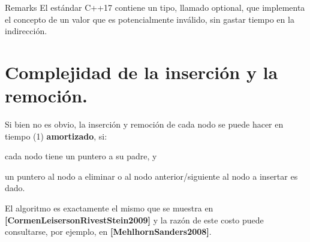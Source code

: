 \begin{DoxyRemark}{Remarks}
El estándar C++17 contiene un tipo, llamado optional, que implementa el concepto de un valor que es potencialmente inválido, sin gastar tiempo en la indirección.
\end{DoxyRemark}
\hypertarget{Implementacion_Inserciones}{}\section{Complejidad de la inserción y la remoción.}\label{Implementacion_Inserciones}
Si bien no es obvio, la inserción y remoción de cada nodo se puede hacer en tiempo (1) {\bfseries amortizado}, si\+:
\begin{DoxyItemize}
\item cada nodo tiene un puntero a su padre, y
\item un puntero al nodo a eliminar o al nodo anterior/siguiente al nodo a insertar es dado.
\end{DoxyItemize}

El algoritmo es exactamente el mismo que se muestra en {\bfseries [Cormen\+Leiserson\+Rivest\+Stein2009]} y la razón de este costo puede consultarse, por ejemplo, en {\bfseries [Mehlhorn\+Sanders2008]}. 